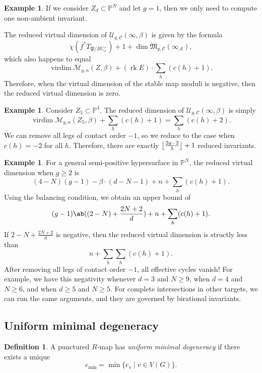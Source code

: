 \documentclass[10pt]{amsart}
\DeclarePairedDelimiter{\floor}{\lfloor}{\rfloor}
\theoremstyle{definition}
\newtheorem{defn}[thm]{Definition}
\newtheorem{exm}[thm]{Example}
\theoremstyle{remark}
\theoremstyle{plain}
\theoremstyle{definition}
\theoremstyle{remark}
\newcommand{\C}{\mathbb{C}}
\renewcommand{\P}{\mathbb{P}}
\newcommand{\Mbar}{\overline{\mathcal{M}}}
\newcommand{\mc}[1]{\mathcal{#1}}
\newcommand{\mf}[1]{\mathfrak{#1}}
\newcommand{\on}[1]{\operatorname{#1}}
\newcommand{\1}{\mathbf{1}}
\newcommand{\2}{\mathbf{2}}
\newcommand{\3}{\mathbf{3}}
\begin{document}
\begin{exm}
    If we consider $Z_d \subset \P^N$ and let $g=1$, then we only need to compute one non-ambient invariant.
\end{exm}

The reduced virtual dimension of $\mc{U}_{g, \mc{C}}(\infty,\beta)$ is given by the formula
\[ \chi(f^* T_{\mf{P}/B \C_{\omega}^{\times}}) + 1 + \dim \mf{M}_{g,\mc{C}}(\infty_{\mc{A}}), \]
which also happens to equal
\[ \on{virdim} \Mbar_{g,n}(Z,\beta) + (\on{rk} E) \cdot \sum_h (c(h)+1). \]
Therefore, when the virtual dimension of the stable map moduli is negative, then the reduced virtual dimension is zero.

\begin{exm}
    Consider $Z_5 \subset \P^4$. The reduced dimension of $\mc{U}_{g,\mc{C}}(\infty, \beta)$ is simply
    \[ \on{virdim} \Mbar_{g,n}(Z_5, \beta) + \sum_h (c(h)+1) = \sum_h (c(h)+2). \]
    We can remove all legs of contact order $-1$, so we reduce to the case when $c(h) = -2$ for all $h$. Therefore, there are exactly $\floor*{ \frac{2g-2}{5} }+ 1$ reduced invariants. 
\end{exm}

\begin{exm}
    For a general semi-positive hypersurface in $\P^N$, the reduced virtual dimension when $g \geq 2$ is
    \[ (4-N)(g-1) - \beta \cdot (d-N-1) + n + \sum_h (c(h)+1). \]
    Using the balancing condition, we obtain an upper bound of
    \[ (g-1) \ab((2-N) + \frac{2N+2}{d}) + n + \sum_h (c(h)+1). \]
    If $2-N + \frac{2N+2}{d}$ is negative, then the reduced virtual dimension is structly less than
    \[ n + \sum_h \sum_h (c(h)+1). \]
    After removing all legs of contact order $-1$, all effective cycles vanish! For example, we have this negativity whenever $d=3$ and $N \geq 9$, when $d=4$ and $N \geq 6$, and when $d \geq 5$ and $N \geq 5$. For complete intersections in other targets, we can run the same arguments, and they are governed by birational invariants.
\end{exm}

\subsection{Uniform minimal degeneracy}%
\label{sub:Uniform minimal degeneracy}

\begin{defn}
    A punctured $R$-map has \textit{uniform minimal degeneracy} if there exists a unique
    \[ e_{\min} = \min \{ e_v \mid v \in V(G) \}. \]
\end{defn}
\end{document}
